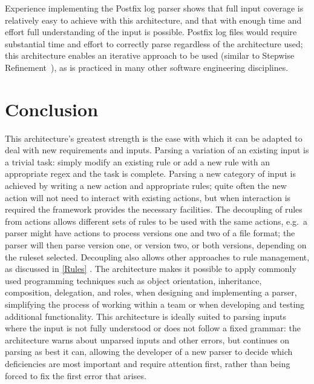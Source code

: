 \documentclass{svmult}
\newcommand{\sectionref}[1]{%
    \textsection{}\vref*{#1}%
}
\begin{document}
Experience implementing the Postfix log parser shows that full input
coverage is relatively easy to achieve with this architecture, and that
with enough time and effort full understanding of the input is possible.
Postfix log files would require substantial time and effort to correctly
parse regardless of the architecture used; this architecture enables an
iterative approach to be used (similar to Stepwise
Refinement~\cite{stepwise-refinement}), as is practiced in many other
software engineering disciplines.

\section{Conclusion}

This architecture's greatest strength is the ease with which it can be
adapted to deal with new requirements and inputs.  Parsing a variation of
an existing input is a trivial task: simply modify an existing rule or add
a new rule with an appropriate regex and the task is complete.  Parsing a
new category of input is achieved by writing a new action and appropriate
rules; quite often the new action will not need to interact with existing
actions, but when interaction is required the framework provides the
necessary facilities.  The decoupling of rules from actions allows
different sets of rules to be used with the same actions, e.g.\ a parser
might have actions to process versions one and two of a file format; the
parser will then parse version one, or version two, or both versions,
depending on the ruleset selected.  Decoupling also allows other approaches
to rule management, as discussed in \sectionref{Rules}.  The architecture
makes it possible to apply commonly used programming techniques such as
object orientation, inheritance, composition, delegation, and roles, when
designing and implementing a parser, simplifying the process of working
within a team or when developing and testing additional functionality.
This architecture is ideally suited to parsing inputs where the input is
not fully understood or does not follow a fixed grammar: the architecture
warns about unparsed inputs and other errors, but continues on parsing as
best it can, allowing the developer of a new parser to decide which
deficiencies are most important and require attention first, rather than
being forced to fix the first error that arises.
\end{document}

